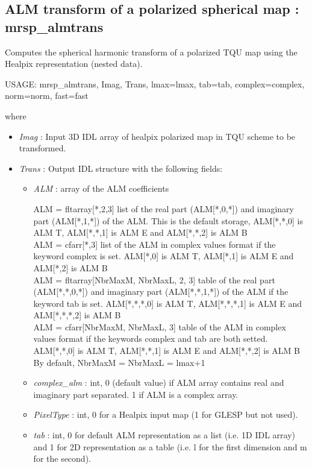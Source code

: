 \subsection{ALM transform of a polarized spherical map : mrsp\_almtrans}
Computes the spherical harmonic transform of a polarized TQU map using the Healpix representation (nested data).
{\bf
\begin{center}
     USAGE: mrsp\_almtrans, Imag, Trans, lmax=lmax, tab=tab, complex=complex, norm=norm, fast=fast
\end{center}}
where
\begin{itemize}
\item {\em Imag} : Input 3D IDL array of healpix polarized map in TQU scheme to be transformed.
\item {\em Trans} : Output IDL structure with the following fields:
\begin{itemize}
\item {\em ALM} : array of the ALM coefficients
\begin{center}
ALM = fltarray[*,2,3] list of the real part (ALM[*,0,*]) and imaginary part (ALM[*,1,*]) of the ALM. 
This is the default storage, ALM[*,*,0] is ALM T, ALM[*,*,1] is ALM E and ALM[*,*,2] is ALM B\\
ALM = cfarr[*,3] list of the ALM in complex values format if the keyword complex is set. 
ALM[*,0] is ALM T, ALM[*,1] is ALM E and ALM[*,2] is ALM B\\
ALM = fltarray[NbrMaxM, NbrMaxL, 2, 3] table of the real part (ALM[*,*,0,*]) and imaginary part (ALM[*,*,1,*]) 
of the ALM if the keyword tab is set. ALM[*,*,*,0] is ALM T, ALM[*,*,*,1] is ALM E and ALM[*,*,*,2] is ALM B\\
ALM = cfarr[NbrMaxM, NbrMaxL, 3] table of the ALM in complex values format if the keywords complex and tab 
are both setted. ALM[*,*,0] is ALM T, ALM[*,*,1] is ALM E and ALM[*,*,2] is ALM B\\
By default, NbrMaxM = NbrMaxL = lmax+1
\end{center}
\item {\em complex\_alm} : int, 0 (default value) if ALM array contains real and imaginary part separated. 
1 if ALM is a complex array.
\item {\em PixelType} : int, 0 for a Healpix input map (1 for GLESP but not used).
\item {\em tab} : int, 0 for default ALM representation as a list (i.e. 1D IDL array) and 1 for 2D 
representation as a table (i.e. l for the first dimension and m for the second).

\end{itemize}
\end{itemize}
